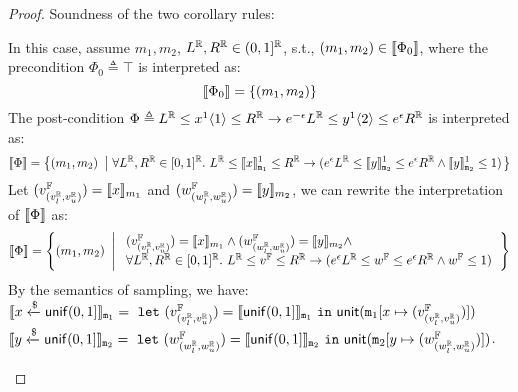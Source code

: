 \documentclass[a4paper,11pt]{article}
\begin{document}
\begin{proof}
Soundness of the two corollary rules:
\begin{itemize}
\caseL{{\small\[
\inferrule
{
	\empty
}
{
	\vdash
	\varx \samplel \uniform(0, 1] 	
	\sim_{\epsilon} 
	\vary \samplel \uniform(0, 1]
	:
	\top
	\Rightarrow
	\forall \rvalL, \rvalR \in [0,1]^{\real}. ~
	\rvalL \leq \varx^1 \langle 1 \rangle \leq \rvalR 
			\imply
	(e^{\epsilon} \rvalL \leq \vary^1 \langle 2 \rangle \leq e^{\epsilon} \rvalR
	\land \vary^1 \langle 2 \rangle \leq 1)	
}~\textbf{unif+}
\]}}
	In this case, 
	assume $m_1, m_2$, $L^{\mathbb{R}}, R^{\mathbb{R}} \in (0,1]^{\mathbb{R}}$, s.t.,
	$(m_1, m_2) \in \llbracket \Phi_0 \rrbracket$, where the precondition
	$
	\Phi_0 \triangleq
	\top
	$
	is interpreted as:
	\[
	\llbracket \Phi_0 \rrbracket =
	\left \{
	(m_1, m_2)
	\right \}
	\]
	The post-condition $\Phi \triangleq 
		L^{\mathbb{R}} \leq x^1 \langle 1 \rangle \leq R^{\mathbb{R}}
		\rightarrow
	e^{-\epsilon} L^{\mathbb{R}} \leq y^1 \langle 2 \rangle \leq e^{\epsilon}R^{\mathbb{R}}
	$ is interpreted as:
	\[
	\llbracket \Phi \rrbracket =
	\left \{
	(m_1, m_2)
	~ \left \vert ~
	\forall L^{\mathbb{R}}, R^{\mathbb{R}} \in [0,1]^{\mathbb{R}}. ~
	L^{\mathbb{R}} \leq \llbracket x \rrbracket_{\mathtt{m}_1}^1 \leq R^{\mathbb{R}}
	\rightarrow
	(e^{\epsilon} L^{\mathbb{R}} \leq \llbracket y \rrbracket_{\mathtt{m}_2}^1 \leq e^{\epsilon}R^{\mathbb{R}}
		\land \llbracket y \rrbracket_{\mathtt{m}_2}^1 \leq 1)
	\right.
	\right \}
	\]
	Let $(v^{\mathbb{F}}_{(v^{\mathbb{R}}_{l}, v^{\mathbb{R}}_{u})}) = \llbracket x \rrbracket_{m_1}$ and 
	$(w^{\mathbb{F}}_{(w^{\mathbb{R}}_{l}, w^{\mathbb{R}}_{u})}) = \llbracket y \rrbracket_{m_2}$, we can rewrite the interpretation of $\llbracket \Phi \rrbracket$ as:
\[
	\llbracket \Phi \rrbracket =
	\left \{
	(m_1, m_2)
	~ \left \vert ~
	\begin{array}{l}
	(v^{\mathbb{F}}_{(v^{\mathbb{R}}_{l}, v^{\mathbb{R}}_{u})}) = \llbracket x \rrbracket_{m_1}
	\land 
	(w^{\mathbb{F}}_{(w^{\mathbb{R}}_{l}, w^{\mathbb{R}}_{u})}) = \llbracket y \rrbracket_{m_2}
	\land
	\\
	\forall L^{\mathbb{R}}, R^{\mathbb{R}} \in [0,1]^{\mathbb{R}}. ~
	L^{\mathbb{R}} \leq v^{\mathbb{F}} \leq R^{\mathbb{R}}
	\rightarrow
	(e^{\epsilon} L^{\mathbb{R}} \leq 
		w^{\mathbb{F}} \leq e^{\epsilon}R^{\mathbb{R}}
		\land w^{\mathbb{F}} \leq 1)
	\end{array}
	\right.
	\right \}
\]
	By the semantics of sampling, we have:\\
	$\llbracket x \xleftarrow{\$} \mathsf{unif}(0, 1] \rrbracket_{\mathtt{m}_1} =
	~\mathtt{let}~ (v^{\mathbb{F}}_{(v^{\mathbb{R}}_{l}, v^{\mathbb{R}}_{u})}) 
	= \llbracket \mathsf{unif}(0, 1] \rrbracket_{\mathtt{m}_1} 
	~\mathtt{in}~ 
	\mathsf{unit}(\mathtt{m}_1[x \mapsto (v^{\mathbb{F}}_{(v^{\mathbb{R}}_{l}, v^{\mathbb{R}}_{u})})])
	$
	\\
	$\llbracket y \xleftarrow{\$} \mathsf{unif}(0, 1] \rrbracket_{\mathtt{m}_2} = 
	~\mathtt{let}~ (w^{\mathbb{F}}_{(w^{\mathbb{R}}_{l}, w^{\mathbb{R}}_{u})})
	= \llbracket \mathsf{unif}(0, 1] \rrbracket_{\mathtt{m}_2} 
	~\mathtt{in}~ 
	\mathsf{unit}(\mathtt{m}_2[y \mapsto (w^{\mathbb{F}}_{(w^{\mathbb{R}}_{l}, w^{\mathbb{R}}_{u})})])
	$. \\

\end{itemize}
\end{proof}
\end{document}
